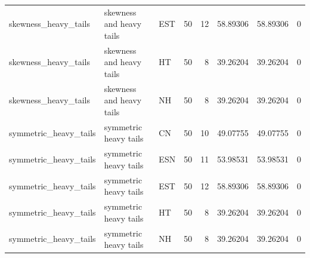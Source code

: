 \begin{table}[!h]
{\begin{tabular}[t]{lllrrrrr}
skewness_heavy_tails & skewness and heavy tails & EST & 50 & 12 & 58.89306 & 58.89306 & 0\\
skewness_heavy_tails & skewness and heavy tails & HT & 50 & 8 & 39.26204 & 39.26204 & 0\\
skewness_heavy_tails & skewness and heavy tails & NH & 50 & 8 & 39.26204 & 39.26204 & 0\\
\addlinespace
symmetric_heavy_tails & symmetric heavy tails & CN & 50 & 10 & 49.07755 & 49.07755 & 0\\
symmetric_heavy_tails & symmetric heavy tails & ESN & 50 & 11 & 53.98531 & 53.98531 & 0\\
symmetric_heavy_tails & symmetric heavy tails & EST & 50 & 12 & 58.89306 & 58.89306 & 0\\
symmetric_heavy_tails & symmetric heavy tails & HT & 50 & 8 & 39.26204 & 39.26204 & 0\\
symmetric_heavy_tails & symmetric heavy tails & NH & 50 & 8 & 39.26204 & 39.26204 & 0\\
\bottomrule
\end{tabular}}
\end{table}
